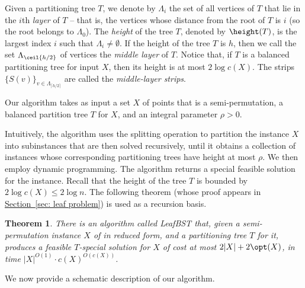 \documentclass[11pt]{article}
\numberwithin{equation}{section}
\newtheorem{theorem}{Theorem}[section]
\theoremstyle{definition}
\theoremstyle{plain}
\newcommand{\expref}[2]{\hyperref[#2]{#1~\ref{#2}}}
\begin{document}
Given a partitioning tree $T$, we denote by $\Lambda_i$ the set of all vertices of $T$ that lie in the $i$th \emph{layer} of $T$ -- that is, the vertices whose distance from the root of $T$ is $i$ (so the root belongs to $\Lambda_0$). The \emph{height} of the tree $T$, denoted by $\height(T)$, is the largest index $i$ such that $\Lambda_i\neq \emptyset$. If the height of the tree $T$ is $h$, then we call the set  $\Lambda_{\ceil{h/2}}$ of vertices the \emph{middle layer} of $T$. Notice that, if $T$ is a balanced partitioning tree for input $X$, then its height is at most $2 \log c(X)$. The strips $\{S(v)\}_{v \in \Lambda_{\lceil h/2 \rceil}}$ are called the \textit{middle-layer strips}. 


Our algorithm takes as input a set $X$ of points that is a semi-permutation, a balanced partition tree $T$ for $X$,  and an integral parameter $\rho>0$. 
%

Intuitively, the algorithm uses the splitting operation to partition the instance $X$ into subinstances that are then solved recursively, until it obtains a collection of instances whose corresponding partitioning trees have height at most $\rho$. We then  employ dynamic programming. 
The algorithm returns a special feasible solution for the instance. 
Recall that the height of the tree $T$ is bounded by $2\log c(X)\leq 2\log n$. 
%
%
The following theorem (whose proof appears in \expref{Section}{sec: leaf problem}) is used as a recursion basis. 

\begin{theorem}
	\label{thm: leaf problem1} 
	There is an algorithm called {\sc LeafBST} that, given a semi-permutation instance $X$ of \minsat in reduced form, and a partitioning tree $T$ for it, produces a feasible $T$-special solution for $X$ of cost at most $2 |X| + 2\opt(X)$, in time $|X|^{O(1)} \cdot c(X)^{O(c(X))}$.
\end{theorem}


%
%
%
%


We now provide a schematic description of our algorithm. 
%



%
\end{document}
